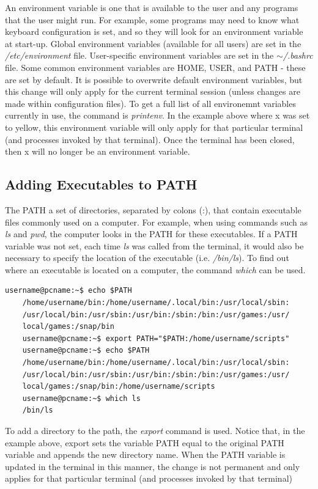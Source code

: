 \documentclass[12pt]{article}
\begin{document}
\quad An environment variable is one that is available to the user and any programs that the user might run. For example, some programs may need to know what keyboard configuration is set, and so they will look for an environment variable at start-up. Global environment variables (available for all users) are set in the \textit{/etc/environment} file. User-specific environment variables are set in the \textit{$\sim$/.bashrc} file. Some common environment variables are HOME, USER, and PATH - these are set by default. It is possible to overwrite default environment variables, but this change will only apply for the current terminal session (unless changes are made within configuration files). To get a full list of all environemnt variables currently in use, the command is \textit{printenv}. In the example above where x was set to yellow, this environment variable will only apply for that particular terminal (and processes invoked by that terminal). Once the terminal has been closed, then x will no longer be an environment variable. 

\subsection{Adding Executables to PATH}
\quad\enskip\quad The PATH a set of directories, separated by colons (:), that contain executable files commonly used on a computer. For example, when using commands such as \textit{ls} and \textit{pwd}, the computer looks in the PATH for these executables. If a PATH variable was not set, each time \textit{ls} was called from the terminal, it would also be necessary to specify the location of the executable (i.e. \textit{/bin/ls}). To find out where an executable is located on a computer, the command \textit{which} can be used.

\begin{lstlisting}[numbers=none]
	username@pcname:~$ echo $PATH
	/home/username/bin:/home/username/.local/bin:/usr/local/sbin:
	/usr/local/bin:/usr/sbin:/usr/bin:/sbin:/bin:/usr/games:/usr/
	local/games:/snap/bin
	username@pcname:~$ export PATH="$PATH:/home/username/scripts"
	username@pcname:~$ echo $PATH
	/home/username/bin:/home/username/.local/bin:/usr/local/sbin:
	/usr/local/bin:/usr/sbin:/usr/bin:/sbin:/bin:/usr/games:/usr/
	local/games:/snap/bin:/home/username/scripts
	username@pcname:~$ which ls
	/bin/ls
\end{lstlisting}
\quad\enskip\quad To add a directory to the path, the \textit{export} command is used. Notice that, in the example above, export sets the variable PATH equal to the original PATH variable and appends the new directory name. When the PATH variable is updated in the terminal in this manner, the change is not permanent and only applies for that particular terminal (and processes invoked by that terminal)
\end{document}
